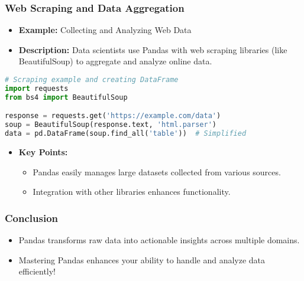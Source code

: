 \documentclass[aspectratio=169]{beamer}
\begin{document}
\begin{frame}[fragile]
    \frametitle{Web Scraping and Data Aggregation}
    \begin{itemize}
        \item \textbf{Example:} Collecting and Analyzing Web Data
        \item \textbf{Description:} Data scientists use Pandas with web scraping libraries (like BeautifulSoup) to aggregate and analyze online data.
    \end{itemize}

    \begin{lstlisting}[language=Python]
# Scraping example and creating DataFrame
import requests
from bs4 import BeautifulSoup

response = requests.get('https://example.com/data')
soup = BeautifulSoup(response.text, 'html.parser')
data = pd.DataFrame(soup.find_all('table'))  # Simplified
    \end{lstlisting}

    \begin{itemize}
        \item \textbf{Key Points:}
        \begin{itemize}
            \item Pandas easily manages large datasets collected from various sources.
            \item Integration with other libraries enhances functionality.
        \end{itemize}
    \end{itemize}
\end{frame}

\begin{frame}
    \frametitle{Conclusion}
    \begin{itemize}
        \item Pandas transforms raw data into actionable insights across multiple domains.
        \item Mastering Pandas enhances your ability to handle and analyze data efficiently!
    \end{itemize}
\end{frame}
\end{document}
